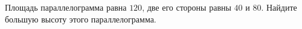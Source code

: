 \begin{ex}
	\begin{condition}
		Площадь параллелограмма равна \( 120 \), две его стороны равны \( 40 \) и \( 80 \). Найдите большую высоту этого параллелограмма.
	\end{condition}
\end{ex}